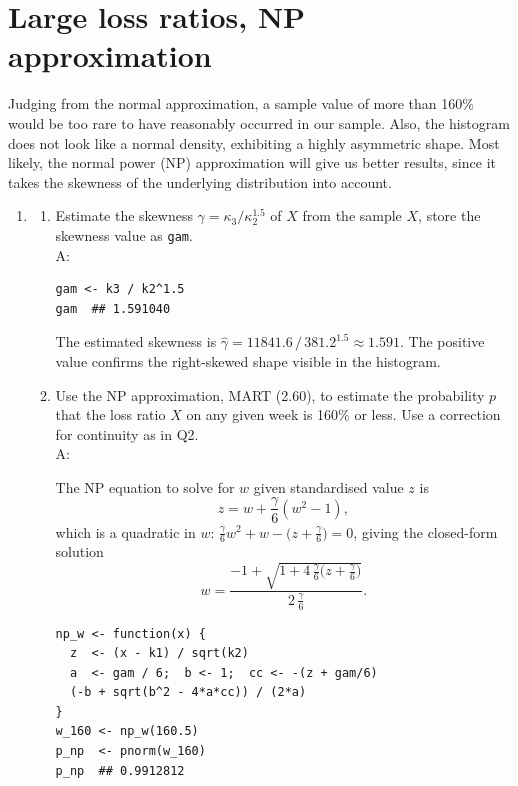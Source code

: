 \documentclass{article}
\begin{document}
\newpage
\section{Large loss ratios, NP approximation}
Judging from the normal approximation, a sample value of more than 160\% would be too rare to have reasonably occurred in our sample. Also, the histogram does not look like a normal density, exhibiting a highly asymmetric shape. Most likely, the normal power (NP) approximation will give us better results, since it takes the skewness of the underlying distribution into account.

\begin{enumerate}
  \item[$\boldsymbol{Q_3}$]
    \begin{enumerate}
      \item[(a)] Estimate the skewness $\gamma = \kappa_3/\kappa_2^{1.5}$ of $X$ from the sample $X$, store the skewness value as \texttt{gam}. \\ A:

\begin{lstlisting}
gam <- k3 / k2^1.5
gam  ## 1.591040
\end{lstlisting}

      The estimated skewness is $\hat{\gamma} = 11841.6 \,/\, 381.2^{1.5} \approx 1.591$. The positive value confirms the right-skewed shape visible in the histogram.

      \item[(b)] Use the NP approximation, MART (2.60), to estimate the probability $p$ that the loss ratio $X$ on any given week is 160\% or less. Use a correction for continuity as in Q2. \\ A:

      The NP equation to solve for $w$ given standardised value $z$ is
      \[
        z = w + \frac{\gamma}{6}(w^2 - 1),
      \]
      which is a quadratic in $w$: $\frac{\gamma}{6}w^2 + w - \bigl(z + \frac{\gamma}{6}\bigr) = 0$, giving the closed-form solution
      \[
        w = \frac{-1 + \sqrt{1 + 4\,\frac{\gamma}{6}\bigl(z + \frac{\gamma}{6}\bigr)}}{2\,\frac{\gamma}{6}}.
      \]

\begin{lstlisting}
np_w <- function(x) {
  z  <- (x - k1) / sqrt(k2)
  a  <- gam / 6;  b <- 1;  cc <- -(z + gam/6)
  (-b + sqrt(b^2 - 4*a*cc)) / (2*a)
}
w_160 <- np_w(160.5)
p_np  <- pnorm(w_160)
p_np  ## 0.9912812
\end{lstlisting}


\end{enumerate}
\end{enumerate}
\end{document}
